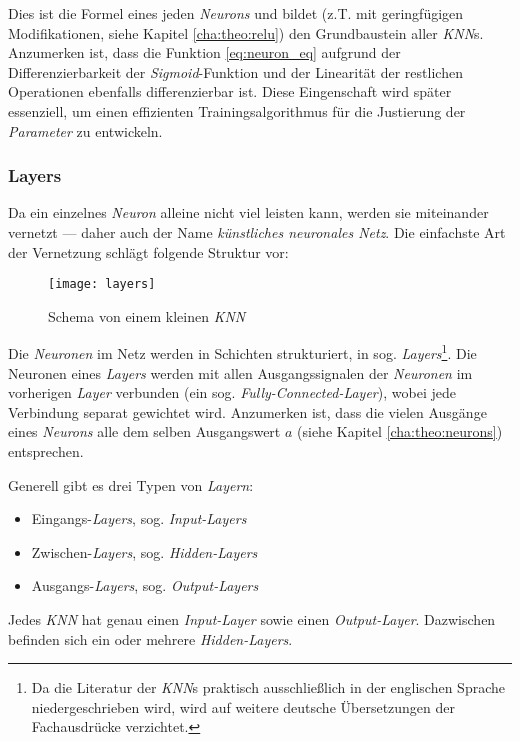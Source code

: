 Dies ist die Formel eines jeden \textit{Neurons} und bildet (z.T. mit geringfügigen Modifikationen, siehe Kapitel \ref{cha:theo:relu}) den Grundbaustein aller \textit{KNN}s.\\

Anzumerken ist, dass die Funktion \ref{eq:neuron_eq} aufgrund der Differenzierbarkeit der \textit{Sigmoid}-Funktion und der Linearität der restlichen Operationen ebenfalls differenzierbar ist. Diese Eingenschaft wird später essenziell, um einen effizienten Trainingsalgorithmus für die Justierung der \textit{Parameter} zu entwickeln.

\newpage

\subsubsection{Layers}\label{cha:theo:layers}

Da ein einzelnes \textit{Neuron} alleine nicht viel leisten kann, werden sie miteinander vernetzt --- daher auch der Name \textit{künstliches neuronales Netz}. Die einfachste Art der Vernetzung schlägt folgende Struktur vor:

\begin{figure}[h]
	\centering
	\texttt{[image: layers]}
	\caption[Schema von kleinem \textit{KNN}]{Schema von einem kleinen \textit{KNN}}
	\label{img:layers}
\end{figure}

Die \textit{Neuronen} im Netz werden in Schichten strukturiert, in sog. \textit{Layers}\footnote{Da die Literatur der \textit{KNN}s praktisch ausschließlich in der englischen Sprache niedergeschrieben wird, wird auf weitere deutsche Übersetzungen der Fachausdrücke verzichtet.}. Die Neuronen eines \textit{Layers} werden mit allen Ausgangssignalen der \textit{Neuronen} im vorherigen \textit{Layer} verbunden (ein sog. \textit{Fully-Connected-Layer}), wobei jede Verbindung separat gewichtet wird. Anzumerken ist, dass die vielen Ausgänge eines \textit{Neurons} alle dem selben Ausgangswert $a$ (siehe Kapitel \ref{cha:theo:neurons}) entsprechen. 

Generell gibt es drei Typen von \textit{Layern}:

\begin{itemize}
	\item Eingangs-\textit{Layers}, sog. \textit{Input-Layers}
	\item Zwischen-\textit{Layers}, sog. \textit{Hidden-Layers}
	\item Ausgangs-\textit{Layers}, sog. \textit{Output-Layers}
\end{itemize}
Jedes \textit{KNN} hat genau einen \textit{Input-Layer} sowie einen \textit{Output-Layer}. Dazwischen befinden sich ein oder mehrere \textit{Hidden-Layers}.

